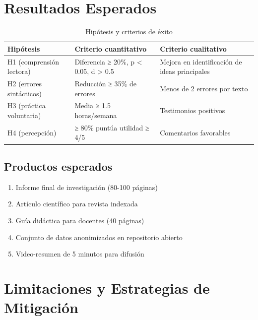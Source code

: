 \documentclass[12pt,spanish]{article}
\begin{document}
\newpage
\section{Resultados Esperados}

\begin{table}[H]
\centering
\caption{Hipótesis y criterios de éxito}
\label{tab:resultados}
\begin{tabular}{|p{3cm}|p{5cm}|p{5cm}|}
\hline
\textbf{Hipótesis} & \textbf{Criterio cuantitativo} & \textbf{Criterio cualitativo} \\
\hline
H1 (comprensión lectora) & Diferencia ≥ 20\%, p < 0.05, d > 0.5 & Mejora en identificación de ideas principales \\
\hline
H2 (errores sintácticos) & Reducción ≥ 35\% de errores & Menos de 2 errores por texto \\
\hline
H3 (práctica voluntaria) & Media ≥ 1.5 horas/semana & Testimonios positivos \\
\hline
H4 (percepción) & ≥ 80\% puntúa utilidad ≥ 4/5 & Comentarios favorables \\
\hline
\end{tabular}
\end{table}

\subsection{Productos esperados}

\begin{enumerate}
    \item Informe final de investigación (80-100 páginas)
    \item Artículo científico para revista indexada
    \item Guía didáctica para docentes (40 páginas)
    \item Conjunto de datos anonimizados en repositorio abierto
    \item Video-resumen de 5 minutos para difusión
\end{enumerate}

\newpage
\section{Limitaciones y Estrategias de Mitigación}
\end{document}
